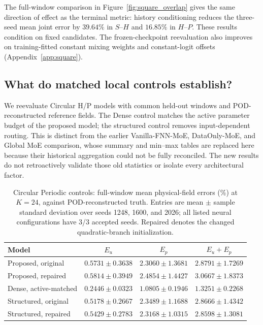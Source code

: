 The full-window comparison in Figure~\ref{fig:square_overlap} gives the
same direction of effect as the terminal metric: history conditioning
reduces the three-seed mean joint error by $39.64\%$ in $S$--$H$ and
$16.85\%$ in $H$--$P$. These results condition on fixed candidates.
The frozen-checkpoint reevaluation also improves on training-fitted
constant mixing weights and constant-logit offsets
(Appendix~\ref{app:square}).

\subsection{What do matched local controls establish?}

We reevaluate Circular H/P models with common held-out windows and
POD-reconstructed reference fields. The Dense control matches the active
parameter budget of the proposed model; the structured control removes
input-dependent routing. This is distinct from the earlier
Vanilla-FNN-MoE, DataOnly-MoE, and Global MoE comparison, whose summary and
min--max tables are replaced here because their historical aggregation
could not be fully reconciled. The new results do not retroactively
validate those old statistics or isolate every architectural factor.

\begin{table}[H]
\centering
\caption{Circular Periodic controls: full-window mean physical-field
errors (\%) at $K=24$, against POD-reconstructed truth. Entries are mean
$\pm$ sample standard deviation over seeds 1248, 1600, and 2026; all
listed neural configurations have 3/3 accepted seeds. Repaired denotes
the changed quadratic-branch initialization.}
\label{tab:circular_full_reorg}
\small
\setlength{\tabcolsep}{4pt}
\begin{tabular}{@{}lccc@{}}
\toprule
Model & $E_u$ & $E_p$ & $E_u+E_p$\\
\midrule
Proposed, original & $0.5731\pm0.3638$ & $2.3060\pm1.3681$ & $2.8791\pm1.7269$\\
Proposed, repaired & $0.5814\pm0.3949$ & $2.4854\pm1.4427$ & $3.0667\pm1.8373$\\
Dense, active-matched & $\mathbf{0.2446\pm0.0323}$ & $\mathbf{1.0805\pm0.1946}$ & $\mathbf{1.3251\pm0.2268}$\\
Structured, original & $0.5178\pm0.2667$ & $2.3489\pm1.1688$ & $2.8666\pm1.4342$\\
Structured, repaired & $0.5429\pm0.2783$ & $2.3168\pm1.0315$ & $2.8598\pm1.3081$\\
\bottomrule
\end{tabular}
\end{table}


